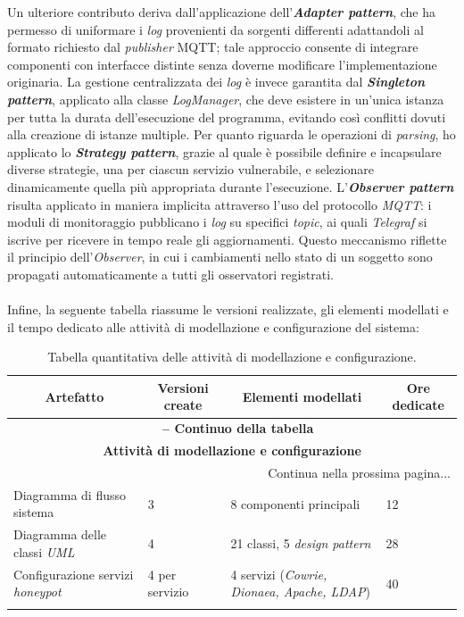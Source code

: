 Un ulteriore contributo deriva dall'applicazione dell'\textbf{\textit{Adapter pattern}}, che ha permesso di uniformare i \textit{log} provenienti da sorgenti differenti adattandoli al formato richiesto dal \textit{publisher} MQTT; tale approccio consente di integrare componenti con interfacce distinte senza doverne modificare l'implementazione originaria. 
La gestione centralizzata dei \textit{log} è invece garantita dal \textbf{\textit{Singleton pattern}}, applicato alla classe \textit{LogManager}, che deve esistere in un'unica istanza per tutta la durata dell'esecuzione del programma, evitando così conflitti dovuti alla creazione di istanze multiple. 
Per quanto riguarda le operazioni di \textit{parsing}, ho applicato lo \textbf{\textit{Strategy pattern}}, grazie al quale è possibile definire e incapsulare diverse strategie, una per ciascun servizio vulnerabile, e selezionare dinamicamente quella più appropriata durante l'esecuzione. 
L'\textbf{\textit{Observer pattern}} risulta applicato in maniera implicita attraverso l'uso del protocollo \textit{MQTT}: i moduli di monitoraggio pubblicano i \textit{log} su specifici \textit{topic}, ai quali \textit{Telegraf} si iscrive per ricevere in tempo reale gli aggiornamenti. 
Questo meccanismo riflette il principio dell'\textit{Observer}, in cui i cambiamenti nello stato di un soggetto sono propagati automaticamente a tutti gli osservatori registrati.\\\\
Infine, la seguente tabella riassume le versioni realizzate, gli elementi modellati e il tempo dedicato alle attività di modellazione e configurazione del sistema:
\begin{center}
\begin{longtable}{|p{}|p{}|p{}|p{}|}
\hline
\multicolumn{1}{|c|}{\textbf{Artefatto}} & 
\multicolumn{1}{c|}{\textbf{Versioni create}} & 
\multicolumn{1}{c|}{\textbf{Elementi modellati}} & 
\multicolumn{1}{c|}{\textbf{Ore dedicate}} \\ 
\hline
\endfirsthead

\multicolumn{4}{c}{{\bfseries \tablename\ \thetable{} -- Continuo della tabella}}\\
\hline
\multicolumn{4}{|c|}{\textbf{Attività di modellazione e configurazione}} \\ \hline
\endhead

\hline \multicolumn{4}{|r|}{{Continua nella prossima pagina...}} \\ \hline
\endfoot

\endlastfoot

Diagramma di flusso sistema & 3 & 8 componenti principali & 12 \\ \hline
Diagramma delle classi \textit{UML} & 4 & 21 classi, 5 \textit{design pattern} & 28 \\ \hline
Configurazione servizi \textit{honeypot} & 4 per servizio & 4 servizi (\textit{Cowrie, Dionaea, Apache, LDAP}) & 40 \\ \hline

\caption{Tabella quantitativa delle attività di modellazione e configurazione.}
\label{tab:modellazione-configurazione}
\end{longtable}
\end{center}